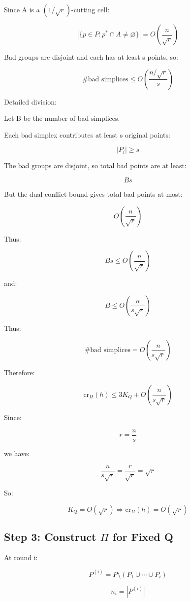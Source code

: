 \documentclass[
  11pt,
]{article}
\begin{document}
Since A is a \((1/\sqrt r)\)-cutting cell:

\[
|\lbrace p\in P:p^\ast \cap A\ne\varnothing \rbrace| = O\left(\frac n{\sqrt r}\right)
\]

Bad groups are disjoint and each has at least s points, so:

\[
\#\text{bad simplices} \le O\left(\frac{n/\sqrt r}{s}\right)
\]

Detailed division:

Let B be the number of bad simplices.

Each bad simplex contributes at least s original points:

\[
|P_i|\ge s
\]

The bad groups are disjoint, so total bad points are at least:

\[
Bs
\]

But the dual conflict bound gives total bad points at most:

\[
O\left(\frac n{\sqrt r}\right)
\]

Thus:

\[
Bs\le O\left(\frac n{\sqrt r}\right)
\]

and:

\[
B\le O\left(\frac n{s\sqrt r}\right)
\]

Thus:

\[
\#\text{bad simplices} = O\left(\frac{n}{s\sqrt r}\right)
\]

Therefore:

\[
\mathrm{cr}_\Pi(h) \le 3K_Q + O\left(\frac{n}{s\sqrt r}\right)
\]

Since:

\[
r=\frac ns
\]

we have:

\[
\frac{n}{s\sqrt r} = \frac r{\sqrt r} = \sqrt r
\]

So:

\[
K_Q=O(\sqrt r) \Longrightarrow \mathrm{cr}_\Pi(h)=O(\sqrt r)
\]

\hypertarget{step-3-construct-pi-for-fixed-q}{%
\subsection{\texorpdfstring{Step 3: Construct \(\Pi\) for Fixed
Q}{Step 3: Construct \textbackslash Pi for Fixed Q}}\label{step-3-construct-pi-for-fixed-q}}

At round i:

\[
P^{(i)}=P\setminus(P_1\cup\cdots\cup P_i)
\]

\[
n_i=|P^{(i)}|
\]
\end{document}
